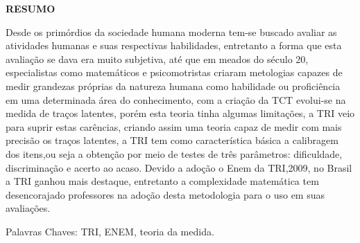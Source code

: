 \begin{center}
	    \textbf{RESUMO}
	\end{center}
	
	Desde os primórdios da sociedade humana moderna tem-se buscado avaliar as atividades humanas e suas respectivas habilidades, entretanto a forma que esta avaliação se dava era muito subjetiva, até que em meados do século 20, especialistas como matemáticos e psicomotristas criaram metologias capazes de medir grandezas próprias da natureza humana como habilidade ou proficiência em uma determinada área do conhecimento, com a criação da TCT evolui-se na medida de traços latentes, porém esta teoria tinha algumas limitações, a TRI veio para suprir estas carências, criando assim uma teoria capaz de medir com mais precisão os traços latentes, a TRI tem como característica básica a calibragem dos itens,ou seja a obtenção por meio de testes de três parâmetros: dificuldade, discriminação e acerto ao acaso. Devido a adoção o Enem da TRI,2009, no Brasil a TRI ganhou mais destaque, entretanto a complexidade matemática tem desencorajado professores na adoção desta metodologia para o uso em suas avaliações.
	\par
	\noindent Palavras Chaves: TRI, ENEM, teoria da medida.
	\newpage